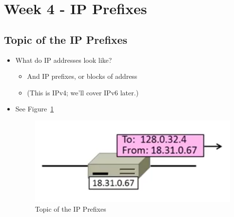 \documentclass[12pt]{ctexart}   %
\begin{document}
\section{Week 4 - IP Prefixes}
	\subsection{Topic of the IP Prefixes}
	\begin{itemize}
		\item What do IP addresses look like?
		\begin{itemize}
			\item And IP prefixes, or blocks of address
			\item (This is IPv4; we'll cover IPv6 later.)
		\end{itemize}
		\item See Figure~\ref{fig:4-4-1}
		
		\begin{figure}[h!] %
		\centering
		 \includegraphics[scale=0.7]{images/4-4-1}
		\caption{ Topic of the IP Prefixes}
		 \label{fig:4-4-1}
		 \end{figure}
	\end{itemize}
	
\end{document}
